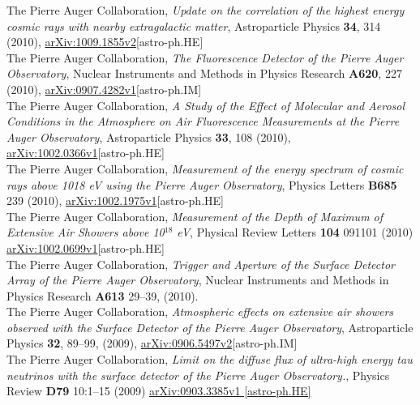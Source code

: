 \documentclass[11pt, a4paper]{article}
\newcommand{\years}[1]{\marginnote{\scriptsize #1}}
\begin{document}
\years{2010}The Pierre Auger Collaboration, {\emph{Update on the correlation of
the highest energy cosmic rays with nearby extragalactic matter}},
Astroparticle Physics {\bf 34}, 314 (2010),
\href{http://arxiv.org/abs/1009.1855}{arXiv:1009.1855v2}[astro-ph.HE]\\

\years{2010}The Pierre Auger Collaboration, {\emph{The Fluorescence Detector of
the Pierre Auger Observatory}}, Nuclear Instruments and Methods in Physics
Research {\bf A620}, 227 (2010),
\href{http://arxiv.org/abs/0907.4282}{arXiv:0907.4282v1}[astro-ph.IM]\\

\years{2010}The Pierre Auger Collaboration, {\emph{A Study of the Effect of
Molecular and Aerosol Conditions in the Atmosphere on Air Fluorescence
Measurements at the Pierre Auger Observatory}}, Astroparticle Physics {\bf 33},
108 (2010),
\href{http://arxiv.org/abs/0907.4282}{arXiv:1002.0366v1}[astro-ph.HE]\\

\years{2010}The Pierre Auger Collaboration, {\emph{Measurement of the energy
spectrum of cosmic rays above 1018 eV using the Pierre Auger Observatory}},
Physics Letters {\bf B685} 239 (2010),
\href{http://arxiv.org/abs/1002.1975}{arXiv:1002.1975v1}[astro-ph.HE]\\

\years{2010}The Pierre Auger Collaboration, {\emph{Measurement of the Depth of
Maximum of Extensive Air Showers above 10$^{18}$ eV}}, Physical Review Letters
{\bf 104} 091101 (2010)
\href{http://arxiv.org/abs/1002.0699}{arXiv:1002.0699v1}[astro-ph.HE]\\

\years{2010}The Pierre Auger Collaboration, {\emph{Trigger and Aperture of the
Surface Detector Array of the Pierre Auger Observatory}}, Nuclear Instruments
and Methods in Physics Research {\bf A613} 29--39, (2010).\\

\years{2009} The Pierre Auger Collaboration, {\emph{Atmospheric effects on
extensive air showers observed with the Surface Detector of the Pierre Auger
Observatory}}, Astroparticle Physics {\bf 32}, 89--99, (2009),
\href{http://arxiv.org/abs/0906.5497/}{arXiv:0906.5497v2}[astro-ph.IM]\\

\years{2009}The Pierre Auger Collaboration, {\emph{Limit on the diffuse flux of
ultra-high energy tau neutrinos with the surface detector of the Pierre Auger
Observatory.}}, Physics Review {\bf D79} 10:1--15 (2009)
\href{http://arxiv.org/abs/0903.3385/}{arXiv:0903.3385v1 [astro-ph.HE]}\\
\end{document}
